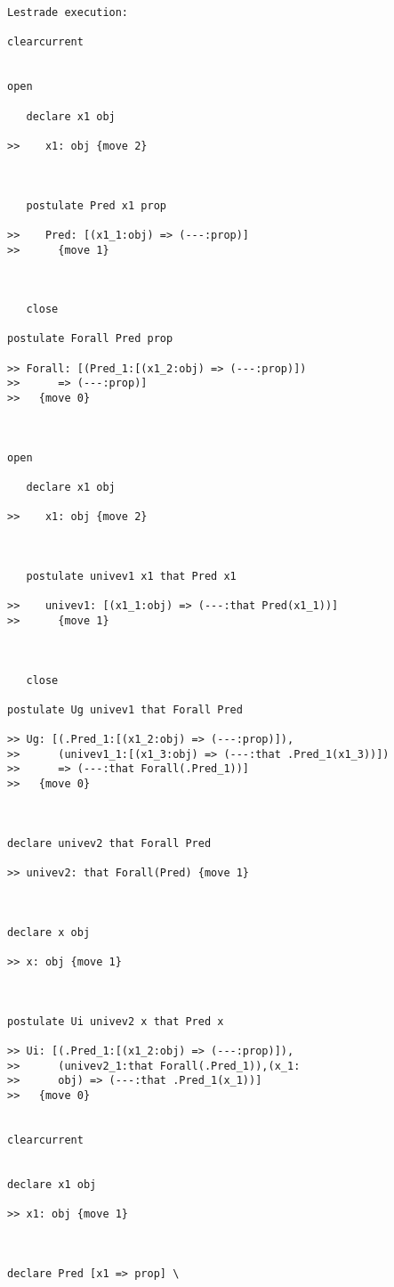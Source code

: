 \documentclass{article}
\begin{document}
\begin{verbatim}Lestrade execution:

clearcurrent


open

   declare x1 obj

>>    x1: obj {move 2}



   postulate Pred x1 prop

>>    Pred: [(x1_1:obj) => (---:prop)]
>>      {move 1}



   close

postulate Forall Pred prop

>> Forall: [(Pred_1:[(x1_2:obj) => (---:prop)])
>>      => (---:prop)]
>>   {move 0}



open

   declare x1 obj

>>    x1: obj {move 2}



   postulate univev1 x1 that Pred x1

>>    univev1: [(x1_1:obj) => (---:that Pred(x1_1))]
>>      {move 1}



   close

postulate Ug univev1 that Forall Pred

>> Ug: [(.Pred_1:[(x1_2:obj) => (---:prop)]),
>>      (univev1_1:[(x1_3:obj) => (---:that .Pred_1(x1_3))])
>>      => (---:that Forall(.Pred_1))]
>>   {move 0}



declare univev2 that Forall Pred

>> univev2: that Forall(Pred) {move 1}



declare x obj

>> x: obj {move 1}



postulate Ui univev2 x that Pred x

>> Ui: [(.Pred_1:[(x1_2:obj) => (---:prop)]),
>>      (univev2_1:that Forall(.Pred_1)),(x_1:
>>      obj) => (---:that .Pred_1(x_1))]
>>   {move 0}


clearcurrent


declare x1 obj

>> x1: obj {move 1}



declare Pred [x1 => prop] \
   




\end{verbatim}
\end{document}
